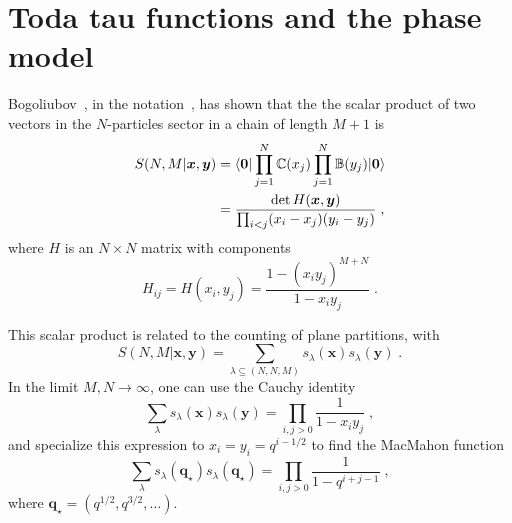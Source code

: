 \documentclass[a4paper,11pt]{amsart}
\begin{document}



\section{Toda tau functions and the phase model}

Bogoliubov~\cite{Bogoliubov2005}, in the notation~\cite{Wheeler:2010vmq},
has shown that the the scalar product of two vectors in the
\(N\)-particles sector in a chain of length \(M + 1\) is
\begin{equation}
\begin{split}
\label{eq:scalar}
  S(N, M|\bm{x}, \bm{y}) & =
  \langle\bm{0}\rvert \prod_{j=1}^N \mathbb{C}(x_j) \prod_{j=1}^N \mathbb{B}(y_j) \lvert\bm{0}\rangle \\ 
 & = \frac{ \det H(\bm{x},\bm{y})}{ \prod_{i<j}(x_i - x_j)(y_i - y_j)} \; ,
\end{split}
\end{equation}
where \(H\) is an \(N\times N\) matrix with components
\begin{equation}
  H_{ij} = H(x_i, y_j) 
  =\frac{1 - (x_i y_j)^{ M + N}}{1 - x_i y_j }\; .
\end{equation}

This scalar product is related to the counting of plane
partitions, with
\begin{equation}
 S(N, M| \bm{x}, \bm{y}) 
 = \sum_{\lambda \subseteq (N, N, M)} s_{\lambda}(\bm{x}) s_{\lambda} (\bm{y})\; .
\end{equation}
In the limit \(M, N \to \infty\), one can use the Cauchy identity
\begin{equation}
  \sum_{\lambda } s_{\lambda}(\bm{x}) s_{\lambda}(\bm{y})
  = \prod_{i,j>0} \frac{1}{1- x_iy_j}\; ,
\end{equation}
and specialize this expression to \( x_i = y_i = q^{i-1/2} \) to find
the MacMahon function
\begin{equation}
  \sum_{\lambda } s_{\lambda}(\bm{q}_\star) s_{\lambda}(\bm{q}_\star) = \prod_{i,j>0} \frac{1}{1- q^{i +j -1}}\; ,
\end{equation}
where \(\bm{q}_{\star} = (q^{1/2}, q^{3/2}, \dots)\). 

\end{document}
